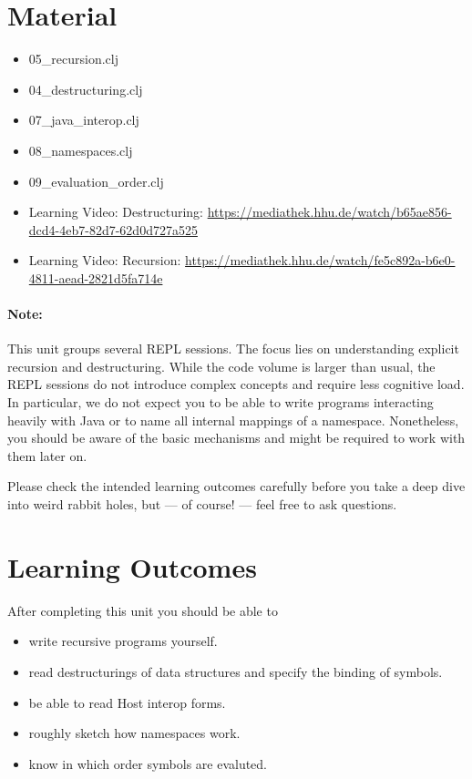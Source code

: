 \documentclass[11pt,a4paper]{article}
\begin{document}
	

\section{Material} 

\begin{itemize}
\item 05\_recursion.clj 
\item 04\_destructuring.clj
\item 07\_java\_interop.clj
\item 08\_namespaces.clj
\item 09\_evaluation\_order.clj
\item Learning Video: Destructuring: \url{https://mediathek.hhu.de/watch/b65ae856-dcd4-4eb7-82d7-62d0d727a525}
\item Learning Video: Recursion: \url{https://mediathek.hhu.de/watch/fe5c892a-b6e0-4811-aead-2821d5fa714e}
\end{itemize}

\paragraph{Note:} This unit groups several REPL sessions.
The focus lies on understanding explicit recursion and destructuring.
While the code volume is larger than usual,
the REPL sessions do not introduce complex concepts
and require less cognitive load.
In particular, we do not expect you to be able to write programs interacting heavily with Java
or to name all internal mappings of a namespace.
Nonetheless, you should be aware of the basic mechanisms
and might be required to work with them later on.

Please check the intended learning outcomes carefully before you take a deep dive into weird rabbit holes,
but --- of course! --- feel free to ask questions.

\section{Learning Outcomes}

After completing this unit you should be able to

\begin{itemize}
    \item write recursive programs yourself.
    \item read destructurings of data structures and specify the binding of symbols.
    \item be able to read Host interop forms.
    \item roughly sketch how namespaces work.
    \item know in which order symbols are evaluted.
\end{itemize}
\end{document}
